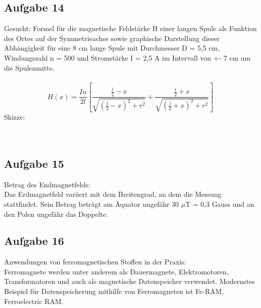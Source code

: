 \documentclass[a4paper,10pt]{scrartcl}
\begin{document}
\subsection{Aufgabe 14}
Gesucht: Formel für die magnetische Feldstärke H einer langen Spule als Funktion des Ortes auf der Symmetrieachse sowie graphische Darstellung dieser Abhängigkeit für eine 8 cm lange Spule mit Durchmesser D = 5,5 cm,  Windungszahl n = 500 und Stromstärke I = 2,5 A im Intervall von +- 7 cm um die Spulenmitte. \\ \\
\begin{equation}
	H(x) = \frac{In}{2l} [\frac{\frac{l}{2}-x}{\sqrt{(\frac{l}{2}-x)^2+r^2}}+\frac{\frac{l}{2}+x}{\sqrt{(\frac{l}{2}+x)^2+r^2}}]
\end{equation}
Skizze: \\ \\ \\ 

\subsection{Aufgabe 15}
Betrag des Endmagnetfelds: \\
Das Erdmagnetfeld variiert mit dem Breitengrad, an dem die Messung stattfindet. Sein Betrag beträgt am Äquator ungefähr 30 $\mu$T = 0,3 Gauss und an den Polen ungefähr das Doppelte.
\subsection{Aufgabe 16}
Anwendungen von ferromagnetischen Stoffen in der Praxis: \\
Ferromagnete werden unter anderem als Dauermagnete, Elektromotoren, Transformatoren und auch als magnetische Datenspeicher verwendet. Modernstes Beispiel für Datenspeicherung mithilfe von Ferromagneten ist Fe-RAM, Ferroelectric RAM.

	
\end{document}
